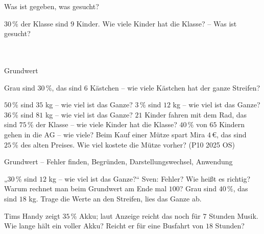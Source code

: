 \setcounter{aufgabe}{19}

\begin{aufgabe}{Was ist gegeben, was gesucht?}
\begin{teile}
\teil $30\,\%$ der Klasse sind $9$ Kinder. Wie viele Kinder hat die Klasse? – Was ist gesucht?\\ \\ \\ 
\end{teile}
\end{aufgabe}

\begin{aufgabe}{Grundwert}
\begin{teile}
\teil Grau sind $30\,\%$, das sind $6$ Kästchen – wie viele Kästchen hat der ganze Streifen?

\leerfeld[Kästchen]
\teil $50\,\%$ sind $35$ kg – wie viel ist das Ganze? \leerfeld[kg]
\teil $3\,\%$ sind $12$ kg – wie viel ist das Ganze? \leerfeld[kg]
\teil $36\,\%$ sind $81$ kg – wie viel ist das Ganze? \leerfeld[kg]
\teil $21$ Kinder fahren mit dem Rad, das sind $75\,\%$ der Klasse – wie viele Kinder hat die Klasse? \leerfeld
\teil $40\,\%$ von $65$ Kindern gehen in die AG – wie viele? \leerfeld
\teil Beim Kauf einer Mütze spart Mira $4\,€$, das sind $25\,\%$ des alten Preises. Wie viel kostete die Mütze vorher? \hfill (P10 2025 OS) \\ \leerfeld[€]
\end{teile}
\end{aufgabe}

\begin{aufgabe}{Grundwert – Fehler finden, Begründen, Darstellungswechsel, Anwendung}
\begin{teile}
\teil „$30\,\%$ sind $12$ kg – wie viel ist das Ganze?“ Sven:  Fehler? Wie heißt es richtig?
\teil Warum rechnet man beim Grundwert am Ende mal $100$?
\teil Grau sind $40\,\%$, das sind $18$ kg. Trage die Werte an den Streifen, lies das Ganze ab.

\leerfeld[kg]
\teil Tims Handy zeigt $35\,\%$ Akku; laut Anzeige reicht das noch für $7$ Stunden Musik. Wie lange hält ein voller Akku? Reicht er für eine Busfahrt von $18$ Stunden?
\end{teile}
\end{aufgabe}
